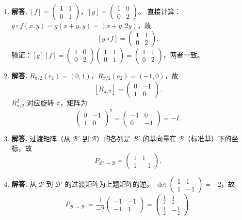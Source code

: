 \begin{enumerate}[label=\textbf{\arabic*.}, leftmargin=*, itemsep=1em]
\item \textbf{解答.}
$[f]=\begin{pmatrix}1&1\\0&1\end{pmatrix}$，$[g]=\begin{pmatrix}1&0\\0&2\end{pmatrix}$。
直接计算：$g\circ f(x,y)=g(x+y,y)=(x+y,2y)$，故
\[
  [g\circ f]=\begin{pmatrix}1&1\\0&2\end{pmatrix}.
\]
验证：$[g][f]=\begin{pmatrix}1&0\\0&2\end{pmatrix}\begin{pmatrix}1&1\\0&1\end{pmatrix}=\begin{pmatrix}1&1\\0&2\end{pmatrix}$，两者一致。

\item \textbf{解答.}
$R_{\pi/2}(e_1)=(0,1)$，$R_{\pi/2}(e_2)=(-1,0)$，故
\[
  [R_{\pi/2}]=\begin{pmatrix}0&-1\\1&0\end{pmatrix}.
\]
$R_{\pi/2}^2$ 对应旋转 $\pi$，矩阵为
\[
  \begin{pmatrix}0&-1\\1&0\end{pmatrix}^2
  =\begin{pmatrix}-1&0\\0&-1\end{pmatrix}=-I.
\]

\item \textbf{解答.}
过渡矩阵（从 $\mathcal{B}'$ 到 $\mathcal{B}$）的各列是 $\mathcal{B}'$ 的基向量在 $\mathcal{B}$（标准基）下的坐标，故
\[
  P_{\mathcal{B}'\to\mathcal{B}}=\begin{pmatrix}1&1\\1&-1\end{pmatrix}.
\]

\item \textbf{解答.}
从 $\mathcal{B}$ 到 $\mathcal{B}'$ 的过渡矩阵为上题矩阵的逆。
$\det\begin{pmatrix}1&1\\1&-1\end{pmatrix}=-2$，故
\[
  P_{\mathcal{B}\to\mathcal{B}'}
  =\frac{1}{-2}\begin{pmatrix}-1&-1\\-1&1\end{pmatrix}
  =\begin{pmatrix}\tfrac{1}{2}&\tfrac{1}{2}\\[4pt]\tfrac{1}{2}&-\tfrac{1}{2}\end{pmatrix}.
\]


\end{enumerate}
